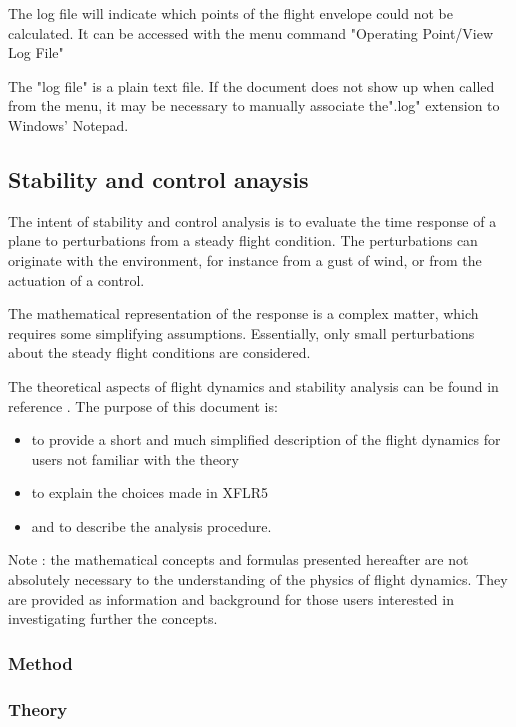 \documentclass[a4paper,twoside,12pt,dvips]{article}
\begin{document}
The log file will indicate which points of the flight envelope could
not be calculated. It can be accessed with the menu command
"Operating Point/View Log File"

The "log file" is a plain text file. If the document does not show
up when called from the menu, it may be necessary to manually
associate the".log" extension to Windows' Notepad.


\subsection{Stability and control anaysis}

The intent of stability and control analysis is to evaluate the time
response of a plane to perturbations from a steady flight condition.
The perturbations can originate with the environment, for instance from
a gust of wind, or from the actuation of a control.

The mathematical representation of the response is a complex matter,
which requires some simplifying assumptions. Essentially, only small
perturbations about the steady flight conditions are considered.

The theoretical aspects of flight dynamics and stability analysis can be
found in reference \cite{Sivells47}. The purpose of this document is:

\begin{itemize}
\item to provide a short and much simplified description of
the flight dynamics for users not familiar with the theory
\item to explain the choices made in XFLR5
\item and to describe the analysis procedure.
\end{itemize}

Note : the mathematical concepts and formulas presented hereafter are
not absolutely necessary to the understanding of the physics of flight
dynamics. They are provided as information and background for those
users interested in investigating further the concepts.

\subsubsection{Method}

\subsubsection{Theory}
\end{document}
